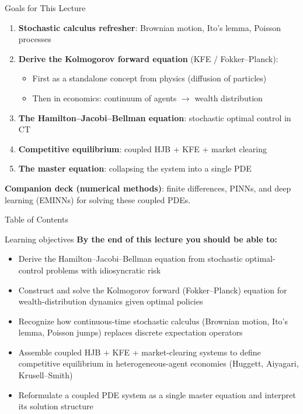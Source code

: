 \documentclass[aspectratio=169,11pt]{beamer}
\newcommand{\emphc}[1]{\textcolor{harvardcrimson}{#1}}
\begin{document}
\begin{frame}{Goals for This Lecture}
\begin{enumerate}\itemsep3pt
    \item \textbf{Stochastic calculus refresher}: Brownian motion, Ito's lemma, Poisson processes
    \item \textbf{Derive the Kolmogorov forward equation} (KFE / Fokker--Planck):
    \begin{itemize}
        \item First as a \emphc{standalone concept from physics} (diffusion of particles)
        \item Then in \emphc{economics}: continuum of agents $\to$ wealth distribution
    \end{itemize}
    \item \textbf{The Hamilton--Jacobi--Bellman equation}: stochastic optimal control in CT
    \item \textbf{Competitive equilibrium}: coupled HJB + KFE + market clearing
    \item \textbf{The master equation}: collapsing the system into a single PDE
\end{enumerate}

\vspace{0.3em}
\begin{center}
\colorbox{uzhgreylight}{\parbox{0.8\textwidth}{\centering\small
\textbf{Companion deck (numerical methods)}: finite differences, PINNs, and deep learning (EMINNs) for solving these coupled PDEs.}}
\end{center}
\end{frame}

\begin{frame}{Table of Contents}
\tableofcontents[hideallsubsections]
\end{frame}

\begin{frame}{Learning objectives}
\textbf{By the end of this lecture you should be able to:}
\begin{itemize}
  \item Derive the Hamilton--Jacobi--Bellman equation from stochastic optimal-control problems with idiosyncratic risk
  \item Construct and solve the Kolmogorov forward (Fokker--Planck) equation for wealth-distribution dynamics given optimal policies
  \item Recognize how continuous-time stochastic calculus (Brownian motion, Ito's lemma, Poisson jumps) replaces discrete expectation operators
  \item Assemble coupled HJB + KFE + market-clearing systems to define competitive equilibrium in heterogeneous-agent economies (Huggett, Aiyagari, Krusell--Smith)
  \item Reformulate a coupled PDE system as a single master equation and interpret its solution structure
\end{itemize}
\end{frame}
\end{document}
